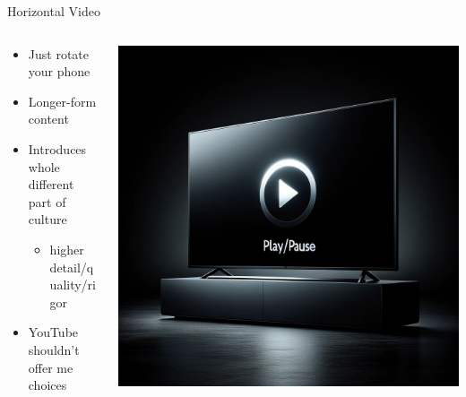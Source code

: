 \documentclass[aspectratio=169]{beamer}
\begin{document}
\begin{frame}{Horizontal Video}
\begin{columns}[T]
    \begin{column}[T]{0.5\textwidth}
        \begin{itemize}
            \item Just rotate your phone
                \item Longer-form content
                \item Introduces whole different part of culture
                \begin{itemize}
                    \item higher detail/quality/rigor
                \end{itemize}
            \item YouTube shouldn't offer me choices
        \end{itemize}
    \end{column}
    \begin{column}{0.5\textwidth}
        \includegraphics[height=0.8\textheight]{imgs/media/horizontal_vid.jpeg}
    \end{column}
\end{columns}
\end{frame}
\end{document}
